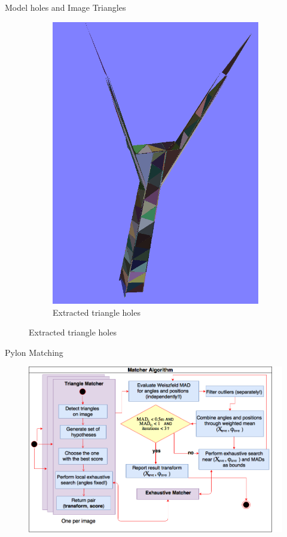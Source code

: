 \documentclass{beamer}
\begin{document}
\begin{frame}[t, fragile]{Model holes and Image Triangles}
\begin{figure}
\begin{subfigure}{.5\textwidth}
\includegraphics[scale=0.2]{colored_3d_triangles}
\caption{Extracted triangle holes}
\end{subfigure}
\end{figure}
\end{frame}


\begin{frame}[t, fragile]{Pylon Matching}

\begin{figure}
\centering
\includegraphics[scale=0.31]{Match}
\end{figure}
 

\end{frame}
\end{document}
